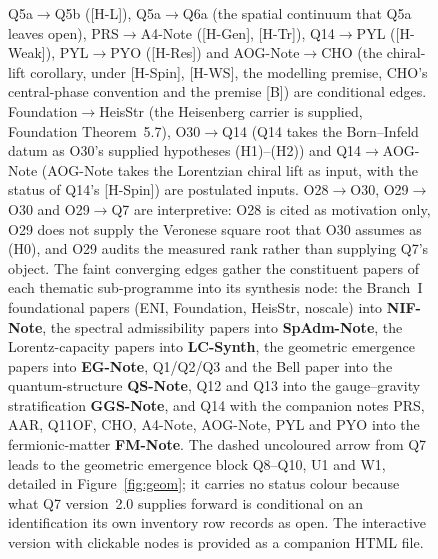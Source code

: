 \documentclass[11pt,a4paper]{article}
\begin{document}
\begin{figure}[p]
{        Q5a$\to$Q5b ([H-L]), Q5a$\to$Q6a (the spatial continuum that Q5a leaves open), PRS$\to$A4-Note ([H-Gen], [H-Tr]), Q14$\to$PYL ([H-Weak]),
        PYL$\to$PYO ([H-Res]) and AOG-Note$\to$CHO (the chiral-lift corollary, under [H-Spin], [H-WS], the modelling
        premise, CHO's central-phase convention and the premise [B]) are conditional edges.
        Foundation$\to$HeisStr (the Heisenberg carrier is supplied, Foundation Theorem~5.7),
        O30$\to$Q14 (Q14 takes the Born--Infeld datum as O30's supplied hypotheses (H1)--(H2)) and
        Q14$\to$AOG-Note (AOG-Note takes the Lorentzian chiral lift as input, with the status of Q14's
        [H-Spin]) are postulated inputs.
        O28$\to$O30, O29$\to$O30 and O29$\to$Q7 are interpretive: O28 is cited as motivation only, O29 does
        not supply the Veronese square root that O30 assumes as (H0), and O29 audits the measured rank
        rather than supplying Q7's object.
        The faint converging edges gather the constituent papers of each thematic sub-programme into
        its synthesis node: the Branch~I foundational papers (ENI, Foundation, HeisStr, noscale) into
        \textbf{NIF-Note}, the spectral admissibility papers into \textbf{SpAdm-Note}, the
        Lorentz-capacity papers into \textbf{LC-Synth}, the geometric emergence papers into
        \textbf{EG-Note}, Q1/Q2/Q3 and the Bell paper into the quantum-structure
        \textbf{QS-Note}, Q12 and Q13 into the gauge--gravity stratification
        \textbf{GGS-Note}, and Q14 with the companion notes PRS, AAR, Q11OF, CHO, A4-Note, AOG-Note, PYL and PYO
        into the fermionic-matter \textbf{FM-Note}.
        The dashed uncoloured arrow from Q7 leads to the geometric emergence block Q8--Q10, U1 and
        W1, detailed in Figure~\ref{fig:geom}; it carries no status colour because what Q7
        version~2.0 supplies forward is conditional on an identification its own inventory row
        records as open.
        The interactive version with clickable nodes is provided as a companion HTML file.}
      \label{fig:dag}
    \end{figure}

    \clearpage
\end{document}
